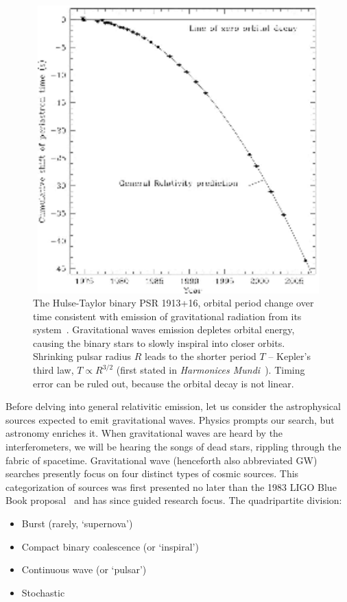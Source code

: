 	\begin{figure}
	\begin{center}
	\includegraphics[height=111mm, width=148mm]{500px-PSR_B1913+16_period_shift_graph.eps}
	\caption{The Hulse-Taylor binary PSR 1913+16, orbital period change over time consistent with emission of gravitational radiation from its system~\cite{Weisberg2010}. Gravitational waves emission depletes orbital energy, causing the binary stars to slowly inspiral into closer orbits. Shrinking pulsar radius $R$ leads to the shorter period $T$ -- Kepler's third law, $T \propto R^{3/2}$ (first stated in \textit{Harmonices Mundi}~\cite{Hawking2002}). Timing error can be ruled out, because the orbital decay is not linear.}
	\label{Hulse-Taylor_binary}
	\end{center}
	\end{figure}

Before delving into general relativitic emission, let us consider the astrophysical sources expected to emit gravitational waves. 
Physics prompts our search, but astronomy enriches it.
When gravitational waves are heard by the interferometers, we will be hearing the songs of dead stars, rippling through the fabric of spacetime.  
Gravitational wave (henceforth also abbreviated GW) searches presently focus on four distinct types of cosmic sources.
This categorization of sources was first presented no later than the 1983 LIGO Blue Book proposal~\cite{CollinsGravityShadow,Schutz1989} and has since guided research focus. 
The quadripartite division:
\begin{itemize}
\item Burst (rarely, `supernova')
\item Compact binary coalescence (or `inspiral')
\item Continuous wave (or `pulsar')
\item Stochastic
\end{itemize}

